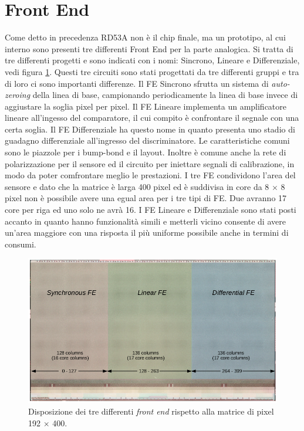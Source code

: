 \section{Front End}
Come detto in precedenza RD53A non è il chip finale, ma un prototipo, al cui interno sono presenti tre differenti Front End per la parte analogica. 
Si tratta di tre differenti progetti e sono indicati con i nomi: Sincrono, Lineare e Differenziale, vedi figura \ref{FrontEnd}. 
Questi tre circuiti sono stati progettati da tre differenti gruppi e tra di loro ci sono importanti differenze. Il FE Sincrono sfrutta un sistema di \textit{auto-zeroing} della linea di base, campionando periodicamente la linea di base invece di aggiustare la soglia pixel per pixel. 
Il FE Lineare implementa un amplificatore lineare all'ingesso del comparatore, il cui compito è confrontare il segnale con una certa soglia. 
Il FE Differenziale ha questo nome in quanto presenta uno stadio di guadagno differenziale  all'ingresso del discriminatore. %
Le caratteristiche comuni sono le piazzole per i bump-bond e il layout. Inoltre è comune anche la rete di polarizzazione per il sensore ed il circuito per iniettare segnali di calibrazione, in modo da poter comfrontare meglio le prestazioni. 
I tre FE condividono l'area del sensore e dato che la matrice è larga 400 pixel ed è suddivisa in core da 8 $\times$ 8 pixel non è possibile avere una egual area per i tre tipi di FE. Due avranno 17 core per riga ed uno solo ne avrà 16. I FE Lineare e Differenziale sono stati posti accanto in quanto hanno funzionalità simili e metterli vicino consente di avere un'area maggiore con una risposta il più uniforme possibile anche in termini di consumi. 
\begin{figure}
\centering
\includegraphics[scale=.3]{Immagini/FrontEnd}
\caption{Disposizione dei tre differenti \textit{front end} rispetto alla matrice di pixel 192 $\times$ 400.}
\label{FrontEnd}
\end{figure}
